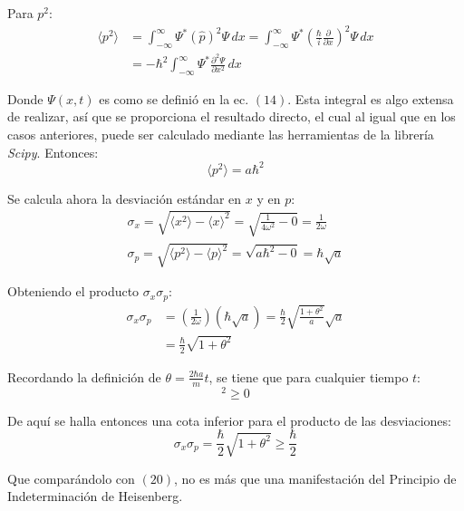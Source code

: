 Para $p^2$:
\begin{align*}
    \langle p^2 \rangle &= \int_{-\infty}^{\infty} \Psi^* (\hat{p})^2 \Psi \, dx = \int_{-\infty}^{\infty} \Psi^* \left( \frac{\hbar}{i} \frac{\partial}{\partial x} \right)^2 \Psi \,dx \\
    &= -\hbar^2 \int_{-\infty}^{\infty} \Psi^* \frac{\partial^2\Psi}{\partial x^2}\,dx
\end{align*}

Donde $\Psi(x,t)$ es como se definió en la ec. $(14)$. Esta integral es algo extensa de realizar, así que se proporciona 
el resultado directo, el cual al igual que en los casos anteriores, puede ser calculado mediante las herramientas de la 
librería \emph{Scipy}. Entonces:
\begin{equation*}
    \langle p^2 \rangle = a\hbar^2
\end{equation*}

Se calcula ahora la desviación estándar en $x$ y en $p$:
\begin{align*}
    \sigma_{x} = \sqrt{\langle x^2 \rangle - \langle x \rangle^2} = \sqrt{\frac{1}{4\omega^2}-0} = \frac{1}{2\omega} \\
    \sigma_{p} = \sqrt{\langle p^2 \rangle - \langle p \rangle^2} = \sqrt{a\hbar^2-0} = \hbar\sqrt{a}
\end{align*}

Obteniendo el producto $\sigma_{x}\sigma_{p}$:
\begin{align*}
    \sigma_{x}\sigma_{p} &= \left( \frac{1}{2\omega} \right) \left( \hbar\sqrt{a} \right) = \frac{\hbar}{2} \sqrt{\frac{1+\theta^2}{a}} \sqrt{a} \\
    &= \frac{\hbar}{2} \sqrt{1+\theta^2}
\end{align*}

Recordando la definición de $\theta = \frac{2\hbar a}{m}t$, se tiene que para cualquier tiempo $t$:
\begin{equation*}
    [\theta(t)]^2 \geq 0
\end{equation*}

De aquí se halla entonces una cota inferior para el producto de las desviaciones:
\begin{equation*}
    \sigma_{x}\sigma_{p} = \frac{\hbar}{2} \sqrt{1+\theta^2} \geq \frac{\hbar}{2}
\end{equation*}

Que comparándolo con $(20)$, no es más que una manifestación del Principio de Indeterminación de Heisenberg.